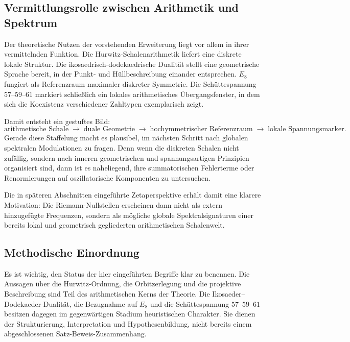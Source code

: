 \documentclass[a4paper,12pt]{article}
\theoremstyle{definition}
\numberwithin{equation}{section}
\begin{document}
	\subsection{Vermittlungsrolle zwischen Arithmetik und Spektrum}
	
	Der theoretische Nutzen der vorstehenden Erweiterung liegt vor allem in ihrer vermittelnden Funktion. Die Hurwitz-Schalenarithmetik liefert eine diskrete lokale Struktur. Die ikosaedrisch-dodekaedrische Dualität stellt eine geometrische Sprache bereit, in der Punkt- und Hüllbeschreibung einander entsprechen. $E_8$ fungiert als Referenzraum maximaler diskreter Symmetrie. Die Schüttespannung $57$--$59$--$61$ markiert schließlich ein lokales arithmetisches Übergangsfenster, in dem sich die Koexistenz verschiedener Zahltypen exemplarisch zeigt.
	
	Damit entsteht ein gestuftes Bild:
	\[
	\text{arithmetische Schale}
	\;\longrightarrow\;
	\text{duale Geometrie}
	\;\longrightarrow\;
	\text{hochymmetrischer Referenzraum}
	\;\longrightarrow\;
	\text{lokale Spannungsmarker}.
	\]
	Gerade diese Staffelung macht es plausibel, im nächsten Schritt nach globalen spektralen Modulationen zu fragen. Denn wenn die diskreten Schalen nicht zufällig, sondern nach inneren geometrischen und spannungsartigen Prinzipien organisiert sind, dann ist es naheliegend, ihre summatorischen Fehlerterme oder Renormierungen auf oszillatorische Komponenten zu untersuchen.
	
	Die in späteren Abschnitten eingeführte Zetaperspektive erhält damit eine klarere Motivation: Die Riemann-Nullstellen erscheinen dann nicht als extern hinzugefügte Frequenzen, sondern als mögliche globale Spektralsignaturen einer bereits lokal und geometrisch gegliederten arithmetischen Schalenwelt.
	
	\subsection{Methodische Einordnung}
	
	Es ist wichtig, den Status der hier eingeführten Begriffe klar zu benennen. Die Aussagen über die Hurwitz-Ordnung, die Orbitzerlegung und die projektive Beschreibung sind Teil des arithmetischen Kerns der Theorie. Die Ikosaeder--Dodekaeder-Dualität, die Bezugnahme auf $E_8$ und die Schüttespannung $57$--$59$--$61$ besitzen dagegen im gegenwärtigen Stadium heuristischen Charakter. Sie dienen der Strukturierung, Interpretation und Hypothesenbildung, nicht bereits einem abgeschlossenen Satz-Beweis-Zusammenhang.
	
\end{document}

